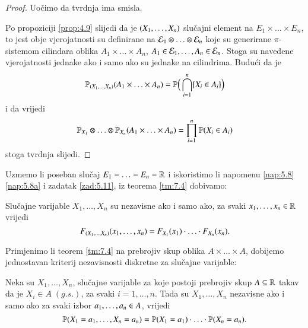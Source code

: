 \begin{proof}
    Uo\v cimo da tvrdnja ima smisla.
    
    Po propoziciji \ref{prop:4.9} slijedi da je $({X}_1, \ldots, {X}_n)$ slu\v cajni element na $E_1 \times \ldots \times E_n$, to jest obje vjerojatnosti su definirane na $\mathcal{E}_1 \otimes \ldots \otimes \mathcal{E}_n$ koje su generirane $\pi$-sistemom cilindara oblika $A_1 \times \ldots \times A_n$, $A_1 \in \mathcal{E}_1, \ldots, A_n \in \mathcal{E}_n$.
    Stoga su navedene vjerojatnosti jednake ako i samo ako su jednake na cilindrima.
    Budu\' ci da je
    \begin{equation*}
        \mathbb{P}_{({X}_1, \ldots, {X}_n)}(A_1 \times \ldots \times A_n) = \mathbb{P} \Big( \bigcap\limits_{i = 1}^{n} \{ X_i \in A_i \} \Big)
    \end{equation*}
    i da vrijedi
    \begin{equation*}
        \mathbb{P}_{X_1} \otimes \ldots \otimes \mathbb{P}_{X_n} (A_1 \times \ldots \times A_n) = \prod\limits_{i = 1}^{n} \mathbb{P}({X_i \in A_i})
    \end{equation*}
    stoga tvrdnja slijedi.
\end{proof}

Uzmemo li poseban slu\v caj $E_1 = \ldots = E_n = \mathbb{R}$ i iskoristimo li napomenu \ref{nap:5.8} \ref{nap:5.8a} i zadatak \ref{zad:5.11}, iz teorema \ref{tm:7.4} dobivamo:

\begin{kor} \label{kor:7.5}
    Slu\v cajne varijable $X_1, \ldots, X_n$ su nezavisne ako i samo ako, za svaki $x_1, \ldots, x_n \in \mathbb{R}$ vrijedi
    \begin{equation*}
        F_{({X}_1, \ldots, {X}_n)}(x_1, \ldots, x_n) = F_{X_1} (x_1) \cdot \ldots \cdot F_{X_n} (x_n).
    \end{equation*}
\end{kor}

Primjenimo li teorem \ref{tm:7.4} na prebrojiv skup oblika $A \times \ldots \times A$, dobijemo jednostavan kriterij nezavisnosti diskretne za slu\v cajne varijable:

\begin{kor} \label{kor:7.6}
    Neka su $X_1, \ldots, X_n$, slu\v cajne varijable za koje postoji prebrojiv skup $A \subseteq \mathbb{R}$ takav da je $X_i \in A \; (g.s.)$, za svaki $i = 1, \ldots, n$.
    Tada su $X_1, \ldots, X_n$ nezavisne ako i samo ako za svaki izbor ${a}_1, \ldots, {a}_n \in A$, vrijedi
    \begin{equation*}
        \mathbb{P} (X_1 = a_1, \ldots, X_n = a_n) = \mathbb{P}({X_1 = a_1}) \cdot \ldots \cdot \mathbb{P}({X_n = a_n}).
    \end{equation*}
\end{kor}

